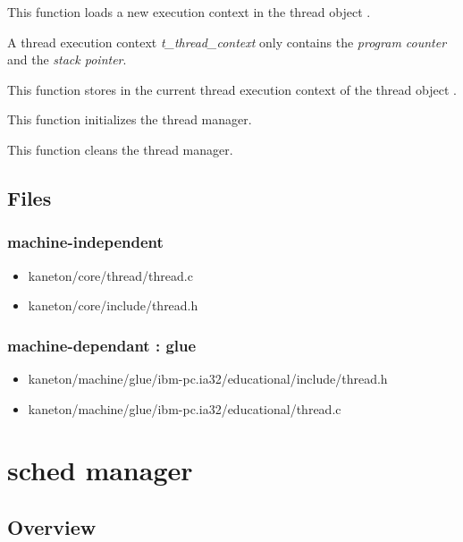 {
  This function loads a new execution context in the thread
  object .

  A thread execution context \textit{t\_thread\_context}
  only contains the \textit{program counter} and the
  \textit{stack pointer}.
}

{
  This function stores in  the current
  thread execution context of the thread object .
}

{
  This function initializes the thread manager.
}

{
  This function cleans the thread manager.
}

\newpage

\subsection*{Files}

\subsubsection{\color{filerefcolor} machine-independent}
\begin{itemize}
\item kaneton/core/thread/thread.c
\item kaneton/core/include/thread.h
\end{itemize}

\subsubsection{\color{filerefcolor} machine-dependant : glue}
\begin{itemize}
\item kaneton/machine/glue/ibm-pc.ia32/educational/include/thread.h
\item kaneton/machine/glue/ibm-pc.ia32/educational/thread.c
\end{itemize}

%
%

\newpage

\section{\textbf{sched} manager}
\subsection*{Overview}

